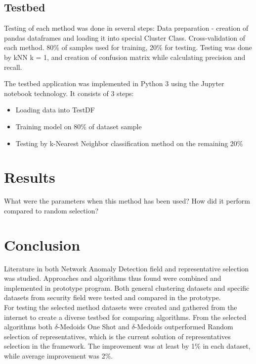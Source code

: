 \documentclass[thesis=B,english]{FITthesis}[2012/10/20]
\begin{document}
\section{Testbed}
Testing of each method was done in several steps:
Data preparation - creation of pandas dataframes and loading it into special Cluster Class.
Cross-validation of each method. 80\% of samples used for training,  20\% for testing.
Testing was done by kNN k = 1, and creation of confusion matrix while calculating precision and recall.

The testbed application was implemented in Python 3 using the Jupyter notebook technology.
It consists of 3 steps:
\begin{itemize}
    \item Loading data into TestDF
    \item Training model on 80\% of dataset sample
    \item Testing by k-Nearest Neighbor classification method on the remaining 20\%
\end{itemize}

\chapter{Results}

What were the parameters when this method has been used?
How did it perform compared to random selection?


\chapter{Conclusion}
Literature in both Network Anomaly Detection field and representative selection was studied.
Approaches and algorithms thus found were combined and implemented in prototype program.
Both general clustering datasets and specific datasets from security field were tested and compared in the prototype. \\

For testing the selected method datasets were created and gathered from the internet to create a diverse testbed for comparing algorithms.
From the selected algorithms both $\delta$-Medoids One Shot and $\delta$-Medoids outperformed Random selection of representatives, which is the current solution of representatives selection in the framework.
The improvement was at least by 1\% in each dataset, while average improvement was 2\%.  \\
\end{document}
